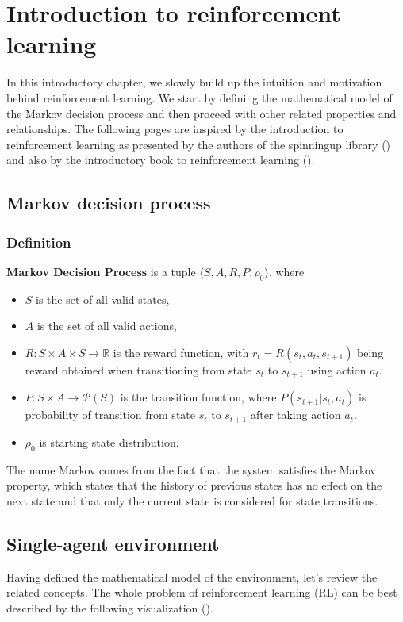 \chapter{Introduction to reinforcement learning}\label{IntroductionChapter}

In this introductory chapter, we slowly build up the intuition and motivation behind reinforcement learning.
We start by defining the mathematical model of the Markov decision process and then proceed with other related properties and relationships.
The following pages are inspired by the introduction to reinforcement learning as presented by the authors of the spinningup library (\cite{SpinningUpIntro}) and also by the introductory book to reinforcement learning (\cite{sutton2018reinforcement}).

\section{Markov decision process}
\subsection*{Definition}

\label{MDP} \textbf{Markov Decision Process} is a tuple $\langle S, A, R, P, \rho_0\rangle$, where
\begin{itemize}
    \item $S$ is the set of all valid states,
    \item $A$ is the set of all valid actions,
    \item $R: S \times A \times S \rightarrow \mathbb{R}$ is the reward function, with $r_t=R(s_t, a_t,s_{t+1})$ being reward obtained when transitioning from state $s_t$ to $s_{t+1}$ using action $a_t$.
    \item $P: S \times A \rightarrow \mathcal{P}(S)$ is the transition function, where $P(s_{t+1}|s_t, a_t)$ is probability of transition from state $s_t$ to $s_{t+1}$ after taking action $a_t$. 
    \item $\rho_0$ is starting state distribution.
\end{itemize}
The name Markov comes from the fact that the system satisfies the Markov property, which states that the history of previous states has no effect on the next state and that only the current state is considered for state transitions.

\section{Single-agent environment}
Having defined the mathematical model of the environment, let's review the related concepts.
The whole problem of reinforcement learning (RL) can be best described by the following visualization (\cite{SpinningUpIntro}).

